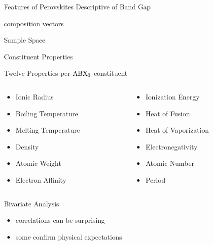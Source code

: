 \documentclass[10pt, aspectratio=169, presentation]{beamer}
\begin{document}
\begin{frame}[label={sec:orge51580d}]{Features of Perovskites Descriptive of Band Gap}
\begin{block}{composition vectors}
\end{block}
\end{frame}

\begin{frame}[label={sec:org8725de9}]{Sample Space}
\end{frame}

\begin{frame}[label={sec:org7167c35}]{Constituent Properties}
\begin{block}{Twelve Properties per \(\ce{ABX_3}\) constituent}
\begin{columns}
\begin{column}{0.5\columnwidth}
\begin{itemize}
\item Ionic Radius
\item Boiling Temperature
\item Melting Temperature
\item Density
\item Atomic Weight
\item Electron Affinity
\end{itemize}
\end{column}
\begin{column}{0.5\columnwidth}
\begin{itemize}
\item Ionization Energy
\item Heat of Fusion
\item Heat of Vaporization
\item Electronegativity
\item Atomic Number
\item Period
\end{itemize}
\end{column}
\end{columns}
\end{block}
\end{frame}

\begin{frame}[label={sec:org02c7a5f}]{Bivariate Analysis}
\begin{itemize}
\item correlations can be surprising
\item some confirm physical expectations
\end{itemize}
\end{frame}
\end{document}
